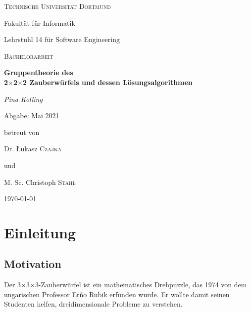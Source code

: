 \documentclass[12pt,a4paper, usenames, dvipsnames]{article}
\newcommand{\Tthree}{3$\times$3$\times$3-}
\begin{document}
\begin{titlepage}
	\centering
	{\scshape\LARGE Technische Universität Dortmund \par}
	Fakultät für Informatik \par
	Lehrstuhl 14 für Software Engineering \par
	\vspace{1cm}
	{\scshape\Large Bachelorarbeit \par }
	\vspace{1.5cm}
	{\huge\bfseries  Gruppentheorie des \\ 2$\times$2$\times$2 Zauberwürfels und dessen Lösungsalgorithmen \par}
	\vspace{2cm}
	{\Large\itshape Pina Kolling\par}
	\vspace{0.5cm}
	{Abgabe: Mai 2021 \par }
	\vfill
	betreut von\par
	Dr. \L ukasz \textsc{Czajka} \par 
	und \par 
	M. Sc. Christoph \textsc{Stahl} 

	\vfill

	{\large \today\par}
\end{titlepage}


\tableofcontents

\thispagestyle{empty} 



\newpage

\setcounter{page}{3} 
%

%
%
%
%
%
%
%
%
%
\section{Einleitung}
%
%
%
%
%
%
%
%
\subsection*{Motivation} 

Der \Tthree Zauberwürfel ist ein mathematisches Drehpuzzle, das 1974 von dem ungarischen Professor Er\~{n}o Rubik erfunden wurde. Er wollte damit seinen Studenten helfen, dreidimensionale Probleme zu verstehen. 
\end{document}
